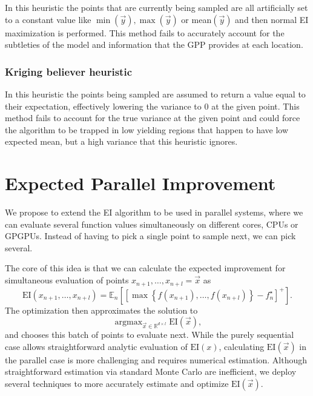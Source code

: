 \documentclass[phd,tocprelim]{cornell}
\DeclareMathOperator*{\argmax}{argmax}
\begin{document}
In this heuristic the points that are currently being sampled are all artificially set to a constant value like $\min(\vec{y}), \max(\vec{y})$ or mean$(\vec{y})$ and then normal EI maximization is performed. This method fails to accurately account for the subtleties of the model and information that the GPP provides at each location.

\subsubsection{Kriging believer heuristic}

In this heuristic the points being sampled are assumed to return a value equal to their expectation, effectively lowering the variance to 0 at the given point. This method fails to account for the true variance at the given point and could force the algorithm to be trapped in low yielding regions that happen to have low expected mean, but a high variance that this heuristic ignores.

\section{Expected Parallel Improvement}

We propose to extend the EI algorithm to be used in parallel systems, where we can evaluate several function values simultaneously on different cores, CPUs or GPGPUs. Instead of having to pick a single point to sample next, we can pick several.

The core of this idea is that we can calculate the expected improvement for simultaneous evaluation of points $x_{n+1}, \ldots, x_{n+l} = \vec{x}$ as
\begin{equation}
 \mbox{EI}(x_{n+1}, \ldots, x_{n+l}) = \mathbb{E}_{n}\left[\left[\max\left\{f(x_{n+1}), \ldots, f(x_{n+l})\right\} - f_{n}^{\star}\right]^{+}\right].
\end{equation}
The optimization then approximates the solution to
\begin{equation}
 \argmax_{\vec{x} \in \mathbb{R}^{d \times l}} \mbox{EI}(\vec{x}),
\end{equation}
and chooses this batch of points to evaluate next. While the purely sequential case allows straightforward analytic evaluation of $\mbox{EI}(x)$, calculating $\mbox{EI}(\vec{x})$ in the parallel case is more challenging and requires numerical estimation. Although straightforward estimation via standard Monte Carlo are inefficient, we deploy several techniques to more accurately estimate and optimize $\mbox{EI}(\vec{x})$.
\end{document}
